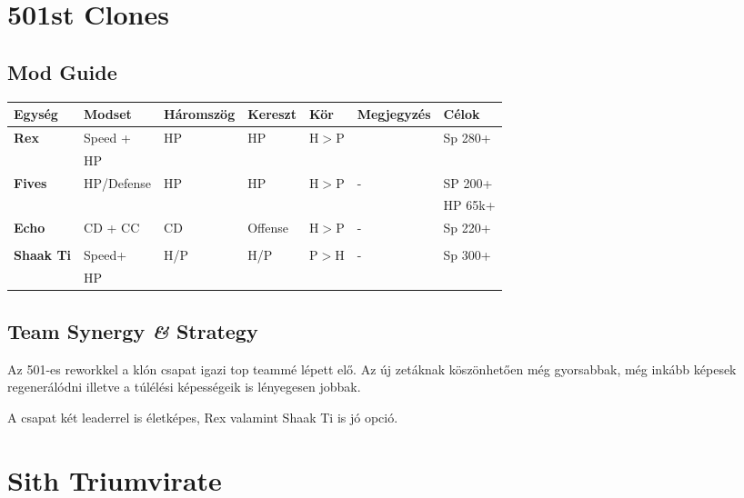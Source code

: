 \documentclass[11pt]{report}
\begin{document}
\chapter{501st Clones}
\section{Mod Guide}
\begin{center}
    \begin{tabular}{|l | l | l | l | l | l | l |}
        \hline
        Egység & Modset & Háromszög & Kereszt & Kör & Megjegyzés & Célok\\ \hline        
        \textbf{Rex} & Speed + & HP & HP & H$>$P &  & Sp 280+\\
        & HP &  &  &  &  & \\ \hline
        \textbf{Fives} & HP/Defense & HP & HP & H$>$P & - & SP 200+\\
        &  &  &  &  &  & HP 65k+\\ \hline
        \textbf{Echo} & CD + CC & CD & Offense & H$>$P & - & Sp 220+\\
        &  &  &  &  &  & \\ \hline
        \textbf{Shaak Ti} & Speed+ & H/P & H/P & P$>$H & - & Sp 300+\\
        & HP &  &  &  &  & \\ \hline
    \end{tabular}
\end{center}
\section{Team Synergy \textit{\&} Strategy}
Az 501-es reworkkel a klón csapat igazi top teammé lépett elő. Az új zetáknak köszönhetően még gyorsabbak, még inkább képesek regenerálódni illetve a túlélési képességeik is lényegesen jobbak.\par
A csapat két leaderrel is életképes, Rex valamint Shaak Ti is jó opció.


\chapter{Sith Triumvirate}
\end{document}
